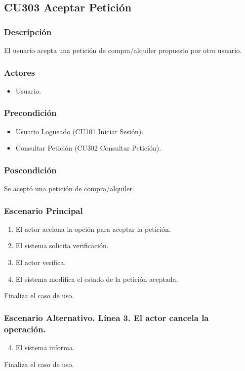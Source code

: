 \subsection{CU303 Aceptar Petici\'{o}n}
\subsubsection{Descripci\'{o}n}
El usuario acepta una petici\'{o}n de compra/alquiler propuesto por otro usuario.
\subsubsection{Actores}
\begin{itemize}
\item Usuario.
\end{itemize}
\subsubsection{Precondici\'{o}n}
\begin{itemize}
\item Usuario Logueado (CU101 Iniciar Sesi\'{o}n).
\item Consultar Petici\'{o}n (CU302 Consultar Petici\'{o}n).
\end{itemize}
\subsubsection{Poscondici\'{o}n}
Se acept\'{o} una petici\'{o}n de compra/alquiler.
\subsubsection{Escenario Principal}
\begin{enumerate}
\item El actor acciona la opci\'{o}n para aceptar la petici\'{o}n.
\item El sistema solicita verificaci\'{o}n.
\item El actor verifica.
\item El sistema modifica el estado de la petici\'{o}n aceptada.
\end{enumerate}
Finaliza el caso de uso.
\subsubsection{Escenario Alternativo. L\'{i}nea 3. El actor cancela la operaci\'{o}n.}
\begin{enumerate}
\setcounter{enumi}{3}
\item El sistema informa.
\end{enumerate}
Finaliza el caso de uso.